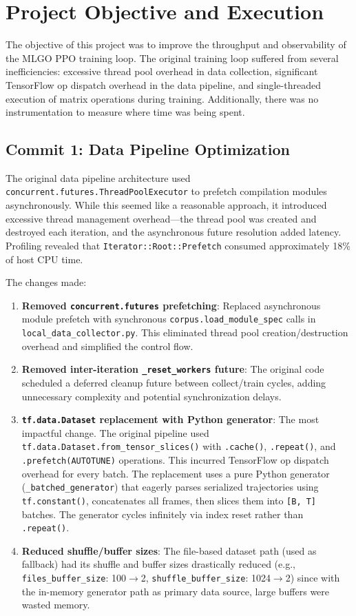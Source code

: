 \documentclass[10pt]{article}
\begin{document}
\section{Project Objective and Execution}

The objective of this project was to improve the throughput and observability of the MLGO PPO training loop. The original training loop suffered from several inefficiencies: excessive thread pool overhead in data collection, significant TensorFlow op dispatch overhead in the data pipeline, and single-threaded execution of matrix operations during training. Additionally, there was no instrumentation to measure where time was being spent.

\subsection{Commit 1: Data Pipeline Optimization}

The original data pipeline architecture used \texttt{concurrent.futures.ThreadPoolExecutor} to prefetch compilation modules asynchronously. While this seemed like a reasonable approach, it introduced excessive thread management overhead---the thread pool was created and destroyed each iteration, and the asynchronous future resolution added latency. Profiling revealed that \texttt{Iterator::Root::Prefetch} consumed approximately 18\% of host CPU time.

The changes made:

\begin{enumerate}
    \item \textbf{Removed \texttt{concurrent.futures} prefetching}: Replaced asynchronous module prefetch with synchronous \texttt{corpus.load\_module\_spec} calls in \texttt{local\_data\_collector.py}. This eliminated thread pool creation/destruction overhead and simplified the control flow.
    \item \textbf{Removed inter-iteration \texttt{\_reset\_workers} future}: The original code scheduled a deferred cleanup future between collect/train cycles, adding unnecessary complexity and potential synchronization delays.
    \item \textbf{\texttt{tf.data.Dataset} replacement with Python generator}: The most impactful change. The original pipeline used \texttt{tf.data.Dataset.from\_tensor\_slices()} with \texttt{.cache()}, \texttt{.repeat()}, and \texttt{.prefetch(AUTOTUNE)} operations. This incurred TensorFlow op dispatch overhead for every batch. The replacement uses a pure Python generator (\texttt{\_batched\_generator}) that eagerly parses serialized trajectories using \texttt{tf.constant()}, concatenates all frames, then slices them into \texttt{[B, T]} batches. The generator cycles infinitely via index reset rather than \texttt{.repeat()}.
    \item \textbf{Reduced shuffle/buffer sizes}: The file-based dataset path (used as fallback) had its shuffle and buffer sizes drastically reduced (e.g., \texttt{files\_buffer\_size}: 100$\rightarrow$2, \texttt{shuffle\_buffer\_size}: 1024$\rightarrow$2) since with the in-memory generator path as primary data source, large buffers were wasted memory.
\end{enumerate}
\end{document}
